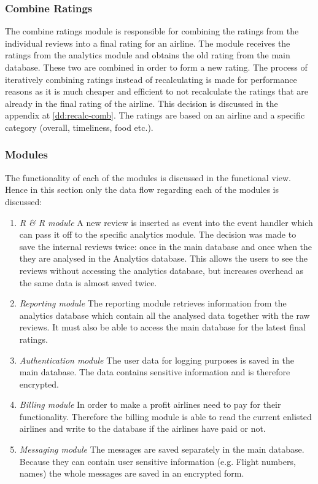 \subsubsection{Combine Ratings}
The combine ratings module is responsible for combining the ratings from the individual reviews into a final rating for an airline. The module receives the ratings from the analytics module and obtains the old rating from the main database. These two are combined in order to form a new rating. The process of iteratively combining ratings instead of recalculating is made for performance reasons as it is much cheaper and efficient to not recalculate the ratings that are already in the final rating of the airline. This decision is discussed in the appendix at \ref{dd:recalc-comb}. The ratings are based on an airline and a specific category (overall, timeliness, food etc.).

\subsubsection{Modules}
The functionality of each of the modules is discussed in the functional view. Hence in this section only the data flow regarding each of the modules is discussed:

\begin{enumerate}
\item \emph{R \& R module} A new review is inserted as event into the event handler which can pass it off to the specific analytics module. The decision was made to save the internal reviews twice: once in the main database and once when the they are analysed in the Analytics database. This allows the users to see the reviews without accessing the analytics database, but increases overhead as the same data is almost saved twice.
\item \emph{Reporting module} The reporting module retrieves information from the analytics database which contain all the analysed data together with the raw reviews. It must also be able to access the main database for the latest final ratings.
\item \emph{Authentication module} The user data for logging purposes is saved in the main database. The data contains sensitive information and is therefore encrypted.
\item \emph{Billing module} In order to make a profit airlines need to pay for their functionality. Therefore the billing module is able to read the current enlisted airlines and write to the database if the airlines have paid or not.
\item \emph{Messaging module} The messages are saved separately in the main database. Because they can contain user sensitive information (e.g. Flight numbers, names) the whole messages are saved in an encrypted form.
\end{enumerate}
